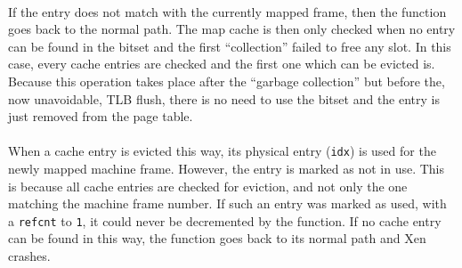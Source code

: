 \paragraph{}
If the entry does not match with the currently mapped frame, then the \map
function goes back to the normal path.
The map cache is then only checked when no entry can be found in the \inuse
bitset and the first ``collection'' failed to free any slot.
In this case, every cache entries are checked and the first one which can be
evicted is.
Because this operation takes place after the ``garbage collection'' but before
the, now unavoidable, TLB flush, there is no need to use the \garbage bitset
and the entry is just removed from the page table.

\paragraph{}
When a cache entry is evicted this way, its physical entry (\texttt{idx}) is
used for the newly mapped machine frame.
However, the entry is marked as not in use.
This is because all cache entries are checked for eviction, and not only the
one matching the machine frame number.
If such an entry was marked as used, with a \texttt{refcnt} to \texttt{1}, it
could never be decremented by the \unmap function.
If no cache entry can be found in this way, the \map function goes back to its
normal path and Xen crashes.

